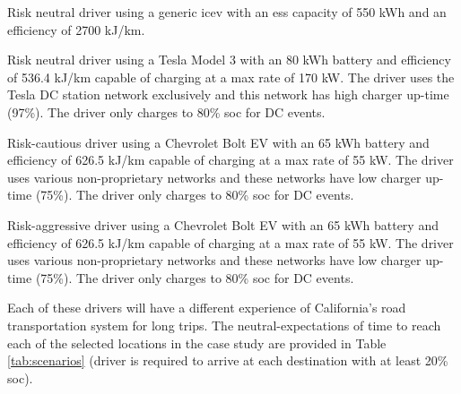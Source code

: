 \documentclass[11pt]{article}
\begin{document}
\begin{multicols}{2}
\begin{compactenum}
	\item Risk neutral driver using a generic \gls{icev} with an \gls{ess} capacity of 550 kWh and an efficiency of 2700 kJ/km.
	\item Risk neutral driver using a Tesla Model 3 with an 80 kWh battery and efficiency of 536.4 kJ/km capable of charging at a max rate of 170 kW. The driver uses the Tesla DC station network exclusively and this network has high charger up-time (97\%). The driver only charges to 80\% \gls{soc} for DC events.
	\item Risk-cautious driver using a Chevrolet Bolt EV with an 65 kWh battery and efficiency of 626.5 kJ/km capable of charging at a max rate of 55 kW. The driver uses various non-proprietary networks and these networks have low charger up-time (75\%). The driver only charges to 80\% \gls{soc} for DC events.
	\item Risk-aggressive driver using a Chevrolet Bolt EV with an 65 kWh battery and efficiency of 626.5 kJ/km capable of charging at a max rate of 55 kW. The driver uses various non-proprietary networks and these networks have low charger up-time (75\%). The driver only charges to 80\% \gls{soc} for DC events.
\end{compactenum}

Each of these drivers will have a different experience of California's road transportation system for long trips. The neutral-expectations of time to reach each of the selected locations in the case study are provided in Table \ref{tab:scenarios} (driver is required to arrive at each destination with  at least 20\% \gls{soc}).


\end{multicols}
\end{document}
